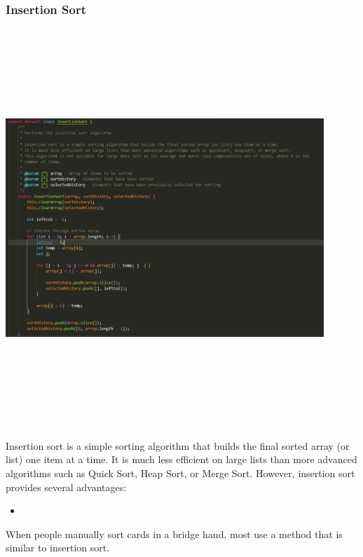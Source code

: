 \subsubsection{Insertion Sort}
\begin{center}
    \includegraphics[width=12cm,height=15cm,keepaspectratio]{images/insertionsort}
\end{center}
Insertion sort is a simple sorting algorithm that builds the final sorted array (or list) one item at a time. It is much less efficient on large lists than more advanced algorithms such as Quick Sort, Heap Sort, or Merge Sort. However, insertion sort provides several advantages:

\begin{itemize}
    \item 
\end{itemize}

When people manually sort cards in a bridge hand, most use a method that is similar to insertion sort.


